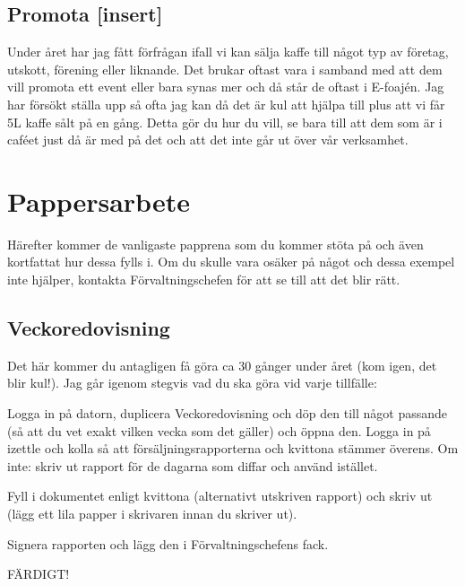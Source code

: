 \documentclass[10pt]{article}
\begin{document}
\subsection{Promota [insert]}
Under året har jag fått förfrågan ifall vi kan sälja kaffe till något typ av företag, utskott, förening eller liknande. Det brukar oftast vara i samband med att dem vill promota ett event eller bara synas mer och då står de oftast i E-foajén. Jag har försökt ställa upp så ofta jag kan då det är kul att hjälpa till plus att vi får 5L kaffe sålt på en gång. Detta gör du hur du vill, se bara till att dem som är i caféet just då är med på det och att det inte går ut över vår verksamhet.

\section{Pappersarbete}
Härefter kommer de vanligaste papprena som du kommer stöta på och även kortfattat hur dessa fylls i. Om du skulle vara osäker på något och dessa exempel inte hjälper, kontakta Förvaltningschefen för att se till att det blir rätt.

\subsection{Veckoredovisning}
Det här kommer du antagligen få göra ca 30 gånger under året (kom igen, det blir kul!). Jag går igenom stegvis vad du ska göra vid varje tillfälle:

\begin{numplist}
    \item Logga in på datorn, duplicera Veckoredovisning och döp den till något passande (så att du vet exakt vilken vecka som det gäller) och öppna den. Logga in på izettle och kolla så att försäljningsrapporterna och kvittona stämmer överens. Om inte: skriv ut rapport för de dagarna som diffar och använd istället.
    \item Fyll i dokumentet enligt kvittona (alternativt utskriven rapport) och skriv ut (lägg ett lila papper i skrivaren innan du skriver ut).
    \item Signera rapporten och lägg den i Förvaltningschefens fack.
    \item FÄRDIGT!
\end{numplist}
\end{document}
